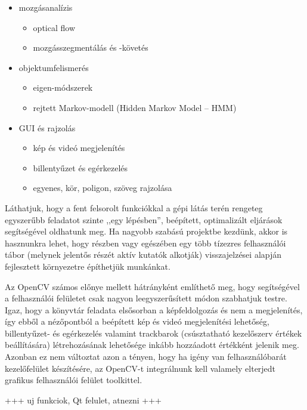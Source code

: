 \begin{itemize}
 \item mozgásanalízis
  \begin{itemize}
   \item optical flow
   \item mozgásszegmentálás és -követés
  \end{itemize}

 \item objektumfelismerés
  \begin{itemize}
   \item eigen-módszerek
   \item rejtett Markov-modell (Hidden Markov Model -- HMM)
  \end{itemize}
  
 \item GUI és rajzolás
  \begin{itemize}
   \item kép és videó megjelenítés
   \item billentyűzet és egérkezelés
   \item egyenes, kör, poligon, szöveg rajzolása
  \end{itemize}
  
\end{itemize}

Láthatjuk, hogy a fent felsorolt funkciókkal a gépi látás terén rengeteg egyszerűbb feladatot szinte ,,egy lépésben'', beépített, optimalizált eljárások segítségével oldhatunk meg. Ha nagyobb szabású projektbe kezdünk, akkor is hasznunkra lehet, hogy részben vagy egészében egy több tízezres felhasználói tábor (melynek jelentős részét aktív kutatók alkotják) visszajelzései alapján fejlesztett környezetre építhetjük munkánkat.

Az OpenCV számos előnye mellett hátrányként említhető meg, hogy segítségével a felhasználói felületet csak nagyon leegyszerűsített módon szabhatjuk testre. Igaz, hogy a könyvtár feladata elsősorban a képfeldolgozás és nem a megjelenítés, így ebből a nézőpontból a beépített kép és videó megjelenítési lehetőség, billentyűzet- és egérkezelés valamint trackbarok (csúsztatható kezelőszerv értékek beállítására) létrehozásának lehetősége inkább hozzáadott értékként jelenik meg. Azonban ez nem változtat azon a tényen, hogy ha igény van felhasználóbarát kezelőfelület készítésére, az OpenCV-t integrálnunk kell valamely elterjedt grafikus felhasználói felület toolkittel.

\bigskip

+++ uj funkciok, Qt felulet, atnezni +++

